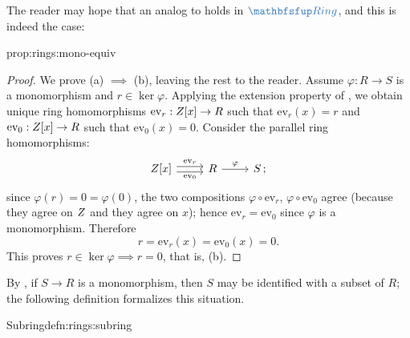 The reader may hope that an analog to
 holds in
$\categ{Ring}$, and this is indeed the case:
\begin{prop}{}{prop:rings:mono-equiv}
\end{prop}
\begin{proof}
  We prove (a) $\implies$ (b), leaving the rest to the reader. Assume
  $\varphi : R \to S$ is a monomorphism and $r \in \ker
  \varphi$. Applying the extension property of
  , we obtain unique ring
  homomorphisms $\mathrm{ev}_r : Z[x] \to R$ such that
  $\mathrm{ev}_r(x) = r$ and $\mathrm{ev}_0 : Z[x] \to R$ such that
  $\mathrm{ev}_0(x) = 0$. Consider the parallel ring homomorphisms:
  \[
    \begin{tikzcd}
      \Z[x] \arrow[r, shift left, "\mathrm{ev}_r"] \arrow[r, shift
      right, "\mathrm{ev}_0"'] & R \arrow[r, "\varphi"] & S\,;
    \end{tikzcd}
  \]
  since $\varphi(r) = 0 = \varphi(0)$, the two compositions
  $\varphi \circ \mathrm{ev}_r$, $\varphi \circ \mathrm{ev}_0$ agree
  (because they agree on $Z$ and they agree on $x$); hence
  $\mathrm{ev}_r = \mathrm{ev}_0$ since $\varphi$ is a monomorphism.
  Therefore
  \[
    r = \mathrm{ev}_r(x) = \mathrm{ev}_0(x) = 0.
  \]
  This proves $r \in \ker \varphi \implies r = 0$, that is, (b).
\end{proof}
By , if $S \to R$ is a monomorphism, then
$S$ may be identified with a subset of $R$; the following definition
formalizes this situation.
\begin{defn}{Subring}{defn:rings:subring}
\end{defn}
   
